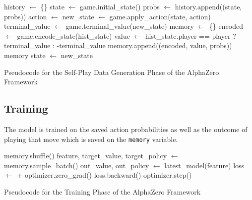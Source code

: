 \begin{algorithm}[htb]
    \begin{algorithmic}[1]
            \State history $\gets$ \{\}
            \State state $\gets$ game.initial\_state()
            \Loop
                \State probs $\gets$ 
                \State history.append((state, probs)) 
                \State action $\gets$ 
                \State new\_state $\gets$ game.apply\_action(state, action)
                \State terminal\_value $\gets$ game.terminal\_value(new\_state)
                    \State memory $\gets$ \{\}
                        \State encoded $\gets$ game.encode\_state(hist\_state)
                        \State value $\gets$ hist\_state.player == player ? terminal\_value : -terminal\_value
                        \State memory.append((encoded, value, probs))
                    \EndFor
                    \State \Return memory
                \EndIf
                \State state $\gets$ new\_state
            \EndLoop
        \EndFunction
    \end{algorithmic}
    \caption{Pseudocode for the Self-Play Data Generation Phase of the AlphaZero Framework}
    \label{alg:data-generation}
\end{algorithm}


\subsection{Training}

The model is trained on the saved action probabilities as well as the outcome of playing that move which is saved on the \lstinline{memory} variable. 
    
\begin{algorithm}[htb]
\begin{algorithmic}
        \State memory.shuffle()
            \State feature, target\_value, target\_policy $\gets$ memory.sample\_batch()
            \State out\_value, out\_policy $\gets$ latest\_model(feature)
            \State loss $\gets$  +
            \State optimizer.zero\_grad()
            \State loss.backward()
            \State optimizer.step()
        \EndFor
    \EndFunction
    \caption{Pseudocode for the Training Phase of the AlphaZero Framework}
    \label{alg:training_phase}
\end{algorithmic}
\end{algorithm}